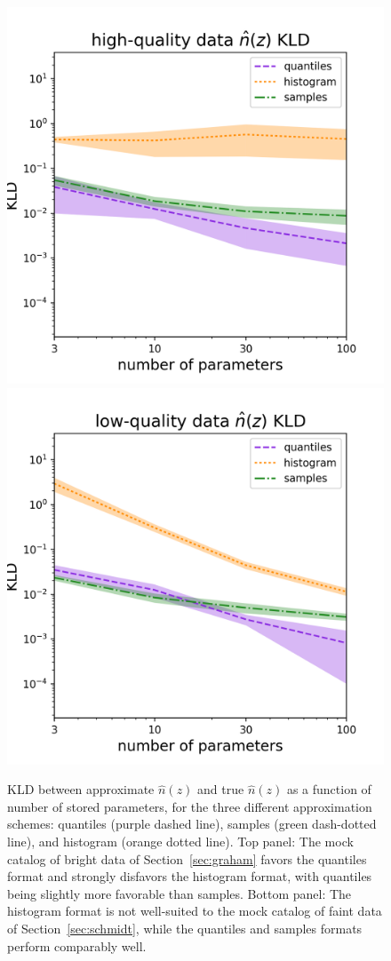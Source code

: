 \documentclass[\docopts]{\docclass}
\newcommand{\mgdata}{bright\xspace}
\newcommand{\ssdata}{faint\xspace}
\begin{document}
\begin{figure}
  \includegraphics[width=0.9\columnwidth]{figures/graham_kld.png}\\
  \includegraphics[width=0.9\columnwidth]{figures/schmidt_kld.png}
  \caption{KLD between approximate $\hat{n}(z)$ and true $\hat{n}(z)$ as a 
function of number of stored parameters, for the three different approximation 
schemes: quantiles (purple dashed line), samples (green dash-dotted line), and 
histogram (orange dotted line).
  Top panel: The mock catalog of \mgdata data of Section~\ref{sec:graham} 
favors the quantiles format and strongly disfavors the histogram format, with 
quantiles being slightly more favorable than samples.
  Bottom panel: The histogram format is not well-suited to the mock catalog of 
\ssdata data of Section~\ref{sec:schmidt}, while the quantiles and samples 
formats perform comparably well.
  \label{fig:kld}}
\end{figure}
\end{document}
